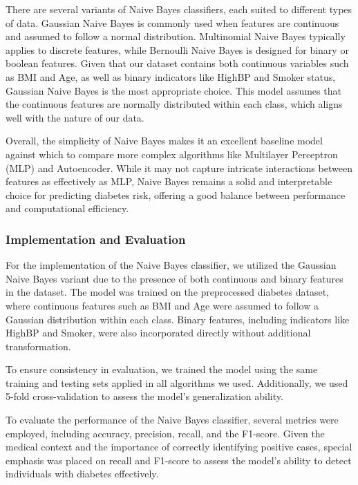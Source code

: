 There are several variants of Naive Bayes classifiers, each suited to different types of data. Gaussian Naive Bayes is commonly used when features are continuous and assumed to follow a normal distribution. Multinomial Naive Bayes typically applies to discrete features, while Bernoulli Naive Bayes is designed for binary or boolean features. Given that our dataset contains both continuous variables such as BMI and Age, as well as binary indicators like HighBP and Smoker status, Gaussian Naive Bayes is the most appropriate choice. This model assumes that the continuous features are normally distributed within each class, which aligns well with the nature of our data.

Overall, the simplicity of Naive Bayes makes it an excellent baseline model against which to compare more complex algorithms like Multilayer Perceptron (MLP) and Autoencoder. While it may not capture intricate interactions between features as effectively as MLP, Naive Bayes remains a solid and interpretable choice for predicting diabetes risk, offering a good balance between performance and computational efficiency.
\newline
\subsubsection{Implementation and Evaluation}

For the implementation of the Naive Bayes classifier, we utilized the Gaussian Naive Bayes variant due to the presence of both continuous and binary features in the dataset. The model was trained on the preprocessed diabetes dataset, where continuous features such as BMI and Age were assumed to follow a Gaussian distribution within each class. Binary features, including indicators like HighBP and Smoker, were also incorporated directly without additional transformation.

To ensure consistency in evaluation, we trained the model using the same training and testing sets applied in all algorithms we used. Additionally, we used 5-fold cross-validation to assess the model’s generalization ability.

To evaluate the performance of the Naive Bayes classifier, several metrics were employed, including accuracy, precision, recall, and the F1-score. Given the medical context and the importance of correctly identifying positive cases, special emphasis was placed on recall and F1-score to assess the model's ability to detect individuals with diabetes effectively.


